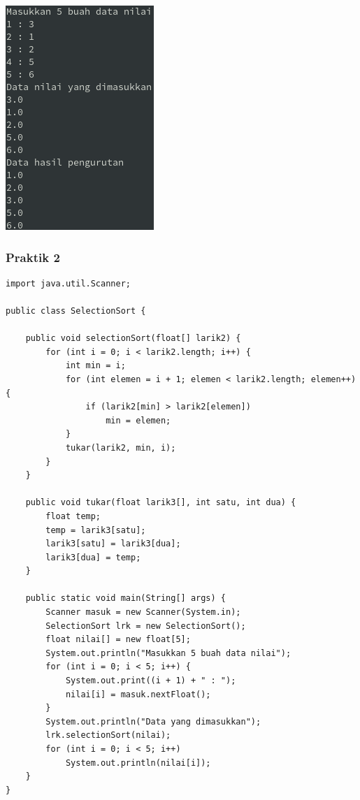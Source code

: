 \documentclass[a4paper,12pt]{article}
\begin{document}
\begin{center}
    \includegraphics[scale=1]{1.png} 
\end{center}

\subsubsection{Praktik 2}
\begin{lstlisting}
import java.util.Scanner;

public class SelectionSort {

    public void selectionSort(float[] larik2) {
        for (int i = 0; i < larik2.length; i++) {
            int min = i;
            for (int elemen = i + 1; elemen < larik2.length; elemen++) {
                if (larik2[min] > larik2[elemen])
                    min = elemen;
            }
            tukar(larik2, min, i);
        }
    }

    public void tukar(float larik3[], int satu, int dua) {
        float temp;
        temp = larik3[satu];
        larik3[satu] = larik3[dua];
        larik3[dua] = temp;
    }

    public static void main(String[] args) {
        Scanner masuk = new Scanner(System.in);
        SelectionSort lrk = new SelectionSort();
        float nilai[] = new float[5];
        System.out.println("Masukkan 5 buah data nilai");
        for (int i = 0; i < 5; i++) {
            System.out.print((i + 1) + " : ");
            nilai[i] = masuk.nextFloat();
        }
        System.out.println("Data yang dimasukkan");
        lrk.selectionSort(nilai);
        for (int i = 0; i < 5; i++)
            System.out.println(nilai[i]);
    }
}
\end{lstlisting}
\end{document}
